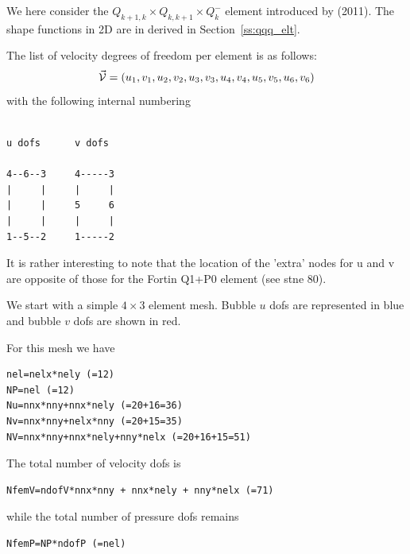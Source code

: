 We here consider the $Q_{k+1,k}\times Q_{k,k+1} \times Q_{k}^-$ element introduced 
by \textcite{huzh11} (2011).
The shape functions in 2D are in derived in Section~\ref{ss:qqq_elt}. 

The list of velocity degrees of freedom per element is as follows:
\[
\vec{\cal V} = (u_1,v_1,u_2,v_2,u_3,v_3,u_4,v_4,u_5,v_5,u_6,v_6)
\]
with the following internal numbering
\begin{verbatim}

u dofs      v dofs

4--6--3     4-----3
|     |     |     |
|     |     5     6
|     |     |     |
1--5--2     1-----2

\end{verbatim}
It is rather interesting to note that the location of the 'extra' 
nodes for u and v are opposite of those for the Fortin Q1+P0 element
(see stne 80).


We start with a simple $4\times 3$ element mesh.
Bubble $u$ dofs are represented in blue and bubble $v$ dofs are shown in red.





For this mesh we have 

\begin{lstlisting}
nel=nelx*nely (=12) 
NP=nel (=12)
Nu=nnx*nny+nnx*nely (=20+16=36)
Nv=nnx*nny+nelx*nny (=20+15=35)
NV=nnx*nny+nnx*nely+nny*nelx (=20+16+15=51)
\end{lstlisting}

The total number of velocity dofs is 
\begin{lstlisting}
NfemV=ndofV*nnx*nny + nnx*nely + nny*nelx (=71)
\end{lstlisting}
while the total number of pressure dofs remains
\begin{lstlisting}
NfemP=NP*ndofP (=nel) 
\end{lstlisting}

